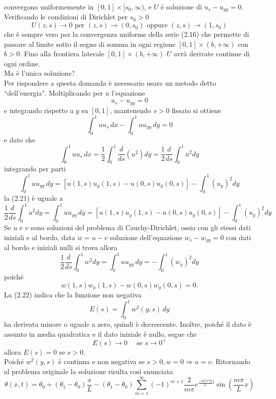 \documentclass[a4paper,12pt, draft]{article}
\theoremstyle{break}
\numberwithin{equation}{section}
\begin{document}
convergono uniformemente in $[0,1] \times [s_0, \infty)$, e $U$ è soluzione di $u_s - u_{yy} = 0$. Verificando le condizioni di Dirichlet per $s_0 > 0$
$$U(z,s) \to 0 \mbox{ per } (z,s) \to (0,s_0) \mbox{ oppure } (z,s) \to (1,s_0)$$
che è sempre vero per la convergenza uniforme della serie (2.16) che permette di passare al limite sotto il segno di somma in ogni regione $[0,1] \times (b, +\infty)$ con $b>0$. Fino alla frontiera laterale $[0,1] \times (b, +\infty)$ $U$ avrà derivate continue di ogni ordine. \\
Ma è l'unica soluzione? \\
Per rispondere a questa domanda è necessario usare un metodo detto “dell'energia".
Moltiplicando per $u$ l'equazione 
\begin{equation}
u_s - u_{yy} = 0
\end{equation}
e integrando rispetto a $y$ su $[0,1]$, mantenendo $s > 0$ fissato si ottiene
\begin{equation}
\int_0^1 uu_s\, dx - \int_0^1 uu_{yy}\, dy = 0
\end{equation}
e dato che
$$\int_0^1 uu_s \, dx = \frac{1}{2} \int_0^1 \frac{d}{ds}(u^2) dy = \frac{1}{2}\frac{d}{ds}\int_0^1 u^2dy$$
integrando per parti 
$$\int_0^1 uu_{yy}\, dy = [u(1,s)u_y(1,s)-u(0,s)u_y(0,s)] - \int_0^1 (u_y)^2 dy$$
la (2.21) è uguale a
$$\frac{1}{2}\frac{d}{ds}\int_0^1 u^2dy = \int_0^1 uu_{yy}\, dy = [u(1,s)u_y(1,s)-u(0,s)u_y(0,s)] - \int_0^1 (u_y)^2 dy$$
Se $u$ e $v$ sono soluzioni del problema di Cauchy-Dirichlet, ossia con gli stessi dati iniziali e al bordo, data $w = u - v$ soluzione dell'equazione $w_s -w_{yy} = 0$ con dati al bordo e iniziali nulli si trova allora
\begin{equation}
\frac{1}{2}\frac{d}{ds}\int_0^1 w^2dy = \int_0^1 uu_{yy}\, dy = - \int_0^1 (w_y)^2 dy
\end{equation}
poiché
$$w(1,s)w_y(1,s)-w(0,s)w_y(0,s) = 0.$$
La (2.22) indica che la funzione non negativa
$$E(s) = \int_0^1 w^2(y,s) \, dy$$
ha derivata minore o uguale a zero, quindi è decrescente. Inoltre, poiché il dato è assunto in media quadratica e il dato iniziale è nullo, segue che
$$E(s) \to 0 \quad \mbox{ se } s \to 0^+$$
allora $E(s) = 0$ se $s > 0$. \\
Poiché $w^2(y,s)$ è continua e non negativa se $s> 0, w = 0 \Longrightarrow u = v$.
Ritornando al problema originale la soluzione risulta così enunciata
$$\theta(x,t) = \theta_0 + (\theta_1 - \theta_0)\frac{x}{L} - (\theta_1 - \theta_0)\sum_{m=1}^{\infty}(-1)^{m+1}\frac{2}{m \pi}e^{\frac{-m^2 \pi^2 D}{L}t} \sin{ \left(\frac{m\pi}{L}x\right)}$$
\end{document}
